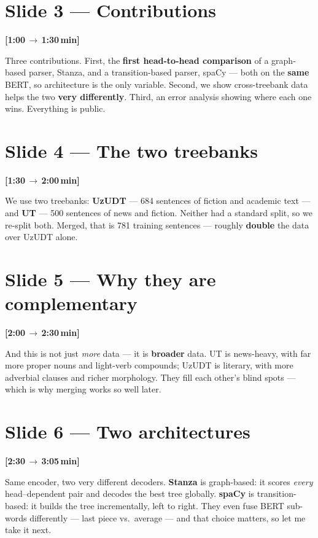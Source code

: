 \documentclass[12pt,a4paper]{article}
\newcommand{\timing}[2]{%
   \par\noindent\textbf{\small [#1\,$\to$\,#2\,min]}\par\vspace{0.15em}}
\newcommand{\say}[1]{\textbf{#1}}
\begin{document}
\section*{Slide 3 --- Contributions}
\timing{1:00}{1:30}
Three contributions. First, the \say{first head-to-head comparison} of a
graph-based parser, Stanza, and a transition-based parser, spaCy --- both
on the \say{same} BERT, so architecture is the only variable. Second, we
show cross-treebank data helps the two \say{very differently}. Third, an
error analysis showing where each one wins. Everything is public.

\section*{Slide 4 --- The two treebanks}
\timing{1:30}{2:00}
We use two treebanks: \say{UzUDT} --- 684 sentences of fiction and
academic text --- and \say{UT} --- 500 sentences of news and fiction.
Neither had a standard split, so we re-split both. Merged, that is 781
training sentences --- roughly \say{double} the data over UzUDT alone.

\section*{Slide 5 --- Why they are complementary}
\timing{2:00}{2:30}
And this is not just \emph{more} data --- it is \say{broader} data. UT is
news-heavy, with far more proper nouns and light-verb compounds; UzUDT is
literary, with more adverbial clauses and richer morphology. They fill
each other's blind spots --- which is why merging works so well later.

\section*{Slide 6 --- Two architectures}
\timing{2:30}{3:05}
Same encoder, two very different decoders. \say{Stanza} is graph-based:
it scores \emph{every} head--dependent pair and decodes the best tree
globally. \say{spaCy} is transition-based: it builds the tree
incrementally, left to right. They even fuse BERT sub-words differently
--- last piece vs.\ average --- and that choice matters, so let me take it
next.

\end{document}
